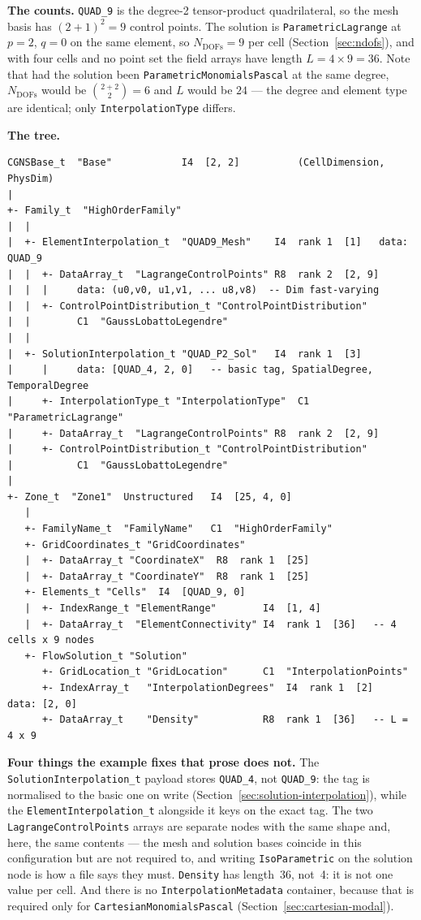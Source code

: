 \documentclass[11pt,letterpaper]{article}
\newif\ifvfourdraft
\newenvironment{v4block}{\ifvfourdraft\color{v4violet}\fi\ignorespaces}{\par}
\begin{document}
\begin{v4block}
\smallskip
\noindent\textbf{The counts.}  \texttt{QUAD\_9} is the degree-2 tensor-product
quadrilateral, so the mesh basis has $(2+1)^2 = 9$ control points.  The solution
is \texttt{ParametricLagrange} at $p=2$, $q=0$ on the same element, so
$N_\mathrm{DOFs} = 9$ per cell (Section~\ref{sec:ndofs}), and with four cells and
no point set the field arrays have length $L = 4\times 9 = 36$.  Note that had the
solution been \texttt{ParametricMonomialsPascal} at the same degree, $N_\mathrm{DOFs}$
would be $\binom{2+2}{2} = 6$ and $L$ would be $24$ --- the degree and element type
are identical; only \texttt{InterpolationType} differs.

\smallskip
\noindent\textbf{The tree.}

{\footnotesize
\begin{verbatim}
CGNSBase_t  "Base"            I4  [2, 2]          (CellDimension, PhysDim)
|
+- Family_t  "HighOrderFamily"
|  |
|  +- ElementInterpolation_t  "QUAD9_Mesh"    I4  rank 1  [1]   data: QUAD_9
|  |  +- DataArray_t  "LagrangeControlPoints" R8  rank 2  [2, 9]
|  |  |     data: (u0,v0, u1,v1, ... u8,v8)  -- Dim fast-varying
|  |  +- ControlPointDistribution_t "ControlPointDistribution"
|  |        C1  "GaussLobattoLegendre"
|  |
|  +- SolutionInterpolation_t "QUAD_P2_Sol"   I4  rank 1  [3]
|     |     data: [QUAD_4, 2, 0]   -- basic tag, SpatialDegree, TemporalDegree
|     +- InterpolationType_t "InterpolationType"  C1  "ParametricLagrange"
|     +- DataArray_t  "LagrangeControlPoints" R8  rank 2  [2, 9]
|     +- ControlPointDistribution_t "ControlPointDistribution"
|           C1  "GaussLobattoLegendre"
|
+- Zone_t  "Zone1"  Unstructured   I4  [25, 4, 0]
   |
   +- FamilyName_t  "FamilyName"   C1  "HighOrderFamily"
   +- GridCoordinates_t "GridCoordinates"
   |  +- DataArray_t "CoordinateX"  R8  rank 1  [25]
   |  +- DataArray_t "CoordinateY"  R8  rank 1  [25]
   +- Elements_t "Cells"  I4  [QUAD_9, 0]
   |  +- IndexRange_t "ElementRange"        I4  [1, 4]
   |  +- DataArray_t  "ElementConnectivity" I4  rank 1  [36]   -- 4 cells x 9 nodes
   +- FlowSolution_t "Solution"
      +- GridLocation_t "GridLocation"      C1  "InterpolationPoints"
      +- IndexArray_t   "InterpolationDegrees"  I4  rank 1  [2]   data: [2, 0]
      +- DataArray_t    "Density"           R8  rank 1  [36]   -- L = 4 x 9
\end{verbatim}
}

\smallskip
\noindent\textbf{Four things the example fixes that prose does not.}
The \texttt{SolutionInterpolation\_t} payload stores \texttt{QUAD\_4}, not
\texttt{QUAD\_9}: the tag is normalised to the basic one on write
(Section~\ref{sec:solution-interpolation}), while the \texttt{ElementInterpolation\_t}
alongside it keys on the exact tag.  The two \texttt{LagrangeControlPoints} arrays
are separate nodes with the same shape and, here, the same contents --- the mesh
and solution bases coincide in this configuration but are not required to, and
writing \texttt{IsoParametric} on the solution node is how a file says they must.
\texttt{Density} has length~36, not~4: it is not one value per cell.  And there is
no \texttt{InterpolationMetadata} container, because that is required only for
\texttt{CartesianMonomialsPascal} (Section~\ref{sec:cartesian-modal}).


\end{v4block}
\end{document}
